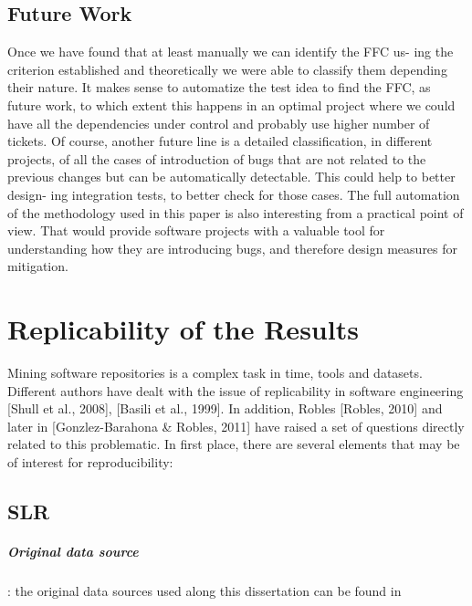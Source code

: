 \documentclass[a4paper, 12pt]{book}
\begin{document}
\section{Future Work}
\label{sec:future}
Once we have found that at least manually we can identify the FFC us- ing the criterion established and theoretically we were able to classify them depending their nature. It makes sense to automatize the test idea to find the FFC, as future work, to which extent this happens in an optimal project where we could have all the dependencies under control and probably use higher number of tickets.
Of course, another future line is a detailed classification, in different projects, of all the cases of introduction of bugs that are not related to the previous changes but can be automatically detectable. This could help to better design- ing integration tests, to better check for those cases.
The full automation of the methodology used in this paper is also interesting from a practical point of view. That would provide software projects with a valuable tool for understanding how they are introducing bugs, and therefore design measures for mitigation.



\cleardoublepage
\appendix
\chapter{Replicability of the Results}
\label{app:replicability}

Mining software repositories is a complex task in time, tools and datasets. Different authors have dealt with the issue of replicability in software engineering [Shull et al., 2008], [Basili et al., 1999]. In addition, Robles [Robles, 2010] and later in [Gonzlez-Barahona \& Robles, 2011] have raised a set of questions directly related to this problematic.
In first place, there are several elements that may be of interest for reproducibility:

\section{SLR}
\label{sec:replicabilitySLR}
\paragraph{Original data source}: the original data sources used along this dissertation can be found in 
\end{document}
